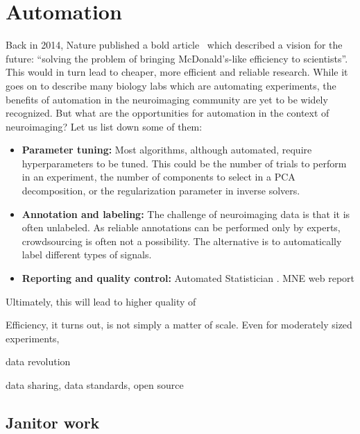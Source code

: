 \section{Automation}
Back in 2014, Nature published a bold article~\citep{hayden2014automated} which described a vision for the future: ``solving the problem of bringing McDonald's-like efficiency to scientists''. This would in turn lead to cheaper, more efficient and reliable research. While it goes on to describe many biology labs which are automating experiments, the benefits of automation in the neuroimaging community are yet to be widely recognized. But what are the opportunities for automation in the context of neuroimaging? Let us list down some of them:
\begin{itemize}[noitemsep,nolistsep,nosep]
\item \textbf{Parameter tuning:} Most algorithms, although automated, require hyperparameters to be tuned. This could be the number of trials to perform in an experiment, the number of components to select in a \ac{PCA} decomposition, or the regularization parameter in inverse solvers.
\item \textbf{Annotation and labeling:} The challenge of neuroimaging data is that it is often unlabeled. As reliable annotations can be performed only by experts, crowdsourcing is often not a possibility. The alternative is to automatically label different types of signals.
\item \textbf{Reporting and quality control:} Automated Statistician . \ac{MNE} web report
\end{itemize}
Ultimately, this will lead to higher quality of 

Efficiency, it turns out, is not simply a matter of scale. Even for moderately sized experiments,

%

data revolution


data sharing, data standards, open source

\subsection{Janitor work}

